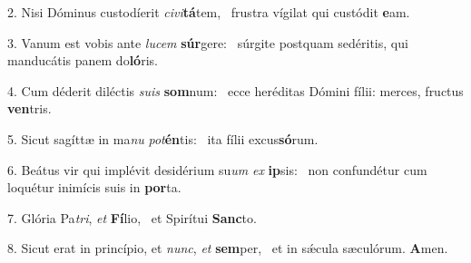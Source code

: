 2. Nisi Dóminus custodíerit \textit{ci}\textit{vi}\textbf{tá}tem, \ast\  frustra vígilat qui custódit \textbf{e}am.\

3. Vanum est vobis ante \textit{lu}\textit{cem} \textbf{súr}gere: \ast\  súrgite postquam sedéritis, qui manducátis panem do\textbf{ló}ris.\

4. Cum déderit diléctis \textit{su}\textit{is} \textbf{som}num: \ast\  ecce heréditas Dómini fílii: merces, fructus \textbf{ven}tris.\

5. Sicut sagíttæ in ma\textit{nu} \textit{pot}\textbf{én}tis: \ast\  ita fílii excus\textbf{só}rum.\

6. Beátus vir qui implévit desidérium su\textit{um} \textit{ex} \textbf{ip}sis: \ast\  non confundétur cum loquétur inimícis suis in \textbf{por}ta.\

7. Glória Pa\textit{tri}, \textit{et} \textbf{Fí}lio, \ast\  et Spirítui \textbf{Sanc}to.\

8. Sicut erat in princípio, et \textit{nunc}, \textit{et} \textbf{sem}per, \ast\  et in sǽcula sæculórum. \textbf{A}men.\

